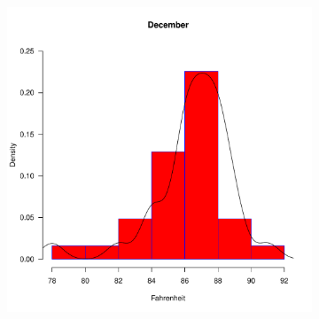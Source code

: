 \documentclass[12pt]{amsart} \usepackage{amscd} \usepackage{epsfig}
\begin{document}
\begin{figure}
\begin{subfigure}{.33\textwidth}
\includegraphics[scale=0.35]{density_december.pdf}
\end{subfigure}
\end{figure}
\end{document}
